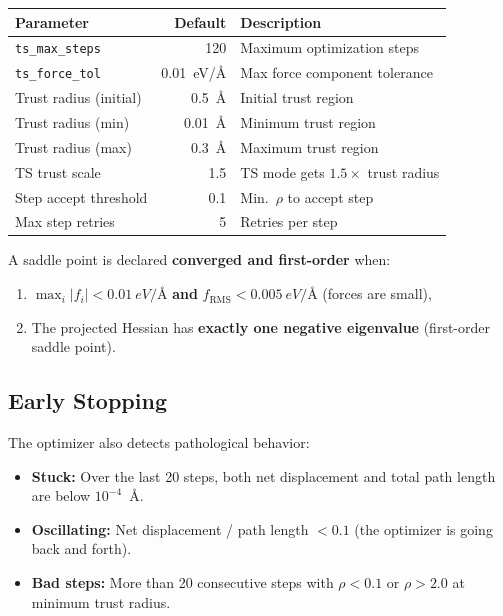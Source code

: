 \documentclass[11pt,a4paper]{article}
\begin{document}
\begin{threshbox}
\begin{tabular}{lrl}
\toprule
Parameter & Default & Description \\
\midrule
\texttt{ts\_max\_steps} & 120 & Maximum optimization steps \\
\texttt{ts\_force\_tol} & \SI{0.01}{eV/\angstrom} & Max force component tolerance \\
Trust radius (initial) & \SI{0.5}{\angstrom} & Initial trust region \\
Trust radius (min) & \SI{0.01}{\angstrom} & Minimum trust region \\
Trust radius (max) & \SI{0.3}{\angstrom} & Maximum trust region \\
TS trust scale & 1.5 & TS mode gets $1.5\times$ trust radius \\
Step accept threshold & 0.1 & Min.\ $\rho$ to accept step \\
Max step retries & 5 & Retries per step \\
\bottomrule
\end{tabular}
\end{threshbox}

A saddle point is declared \textbf{converged and first-order} when:
\begin{enumerate}
    \item $\max_i |f_i| < \SI{0.01}{eV/\angstrom}$ \textbf{and} $f_\text{RMS} < \SI{0.005}{eV/\angstrom}$ (forces are small),
    \item The projected Hessian has \textbf{exactly one negative eigenvalue} (first-order saddle point).
\end{enumerate}

\subsection{Early Stopping}

The optimizer also detects pathological behavior:
\begin{itemize}
    \item \textbf{Stuck:} Over the last 20 steps, both net displacement and total path length are below $10^{-4}$~\AA.
    \item \textbf{Oscillating:} Net displacement / path length $< 0.1$ (the optimizer is going back and forth).
    \item \textbf{Bad steps:} More than 20 consecutive steps with $\rho < 0.1$ or $\rho > 2.0$ at minimum trust radius.
\end{itemize}
\end{document}
